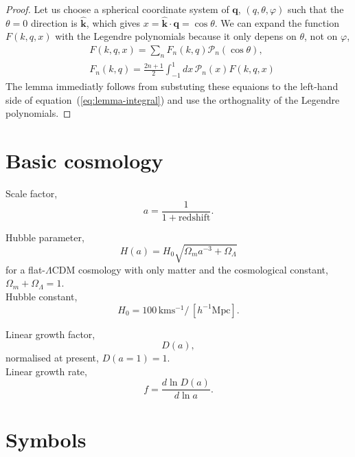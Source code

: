 \documentclass[a4paper,11pt, fleqn]{article}
\begin{document}
\begin{proof}
Let us choose a spherical coordinate system of $\bm{q}$, $(q, \theta,
\varphi)$ such that the $\theta = 0$ direction is $\hat{\bm{k}}$,
which gives $x = \hat{\bm{k}}\cdot\bm{\bm{q}} = \cos\theta$. We can expand
the function $F(k, q, x)$ with the Legendre polynomials because it
only depens on $\theta$, not on $\varphi$,
\begin{align}
  &F(k, q, x) = \sum_n F_{n}(k, q) \mathcal{P}_n(\cos\theta),\\
  &F_{n}(k, q) = \frac{2n + 1}{2} \int_{-1}^1 \! dx \,\mathcal{P}_n(x) F(k, q, x)
\end{align}
The lemma immediatly follows from substuting these equaions to the
left-hand side of equation~(\ref{eq:lemma-integral}) and use the
orthognality of the Legendre polynomials.
\end{proof}


\clearpage
\section{Basic cosmology}

Scale factor,
\begin{equation}
  a = \frac{1}{1 + \mathrm{redshift}}.
\end{equation}

Hubble parameter,
\begin{equation}
  H(a) = H_0 \sqrt{\Omega_m a^{-3} + \Omega_\Lambda}
\end{equation}
for a flat-$\Lambda$CDM cosmology with only matter and the
cosmological constant, $\Omega_m + \Omega_\Lambda = 1$.\\

Hubble constant,
\begin{equation}
  H_0 = 100\,\mathrm{km}\mathrm{s}^{-1} / \,[h^{-1} \mathrm{Mpc}].
\end{equation}


Linear growth factor,
\begin{equation}
  D(a),
\end{equation}
normalised at present, $D(a=1) = 1$.\\

Linear growth rate,
\begin{equation}
  f = \frac{d\ln D(a)}{d\ln a}.
\end{equation}

%
%
\clearpage
\section{Symbols}
\end{document}
